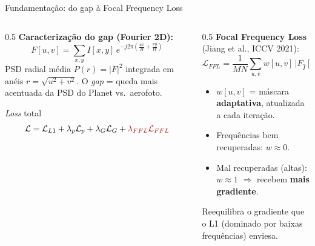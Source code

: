\documentclass[aspectratio=169]{beamer}
\begin{document}
\begin{frame}{Fundamentação: do gap à Focal Frequency Loss}

  \begin{columns}[T]
    \begin{column}{0.5\textwidth}
      \textbf{Caracterização do gap (Fourier 2D):}
      \[
        F[u,v] = \!\!\sum_{x,y}\! I[x,y]\,e^{-j2\pi\left(\frac{ux}{H}+\frac{vy}{W}\right)}
      \]
      PSD radial média $P(r)=|F|^2$ integrada em anéis $r=\sqrt{u^2+v^2}$.
      O \textit{gap} = queda mais acentuada da PSD do Planet vs.\ aerofoto.

      \vspace{0.5em}
      \begin{block}{\textit{Loss} total}
        \[
          \mathcal{L} = \mathcal{L}_{L1} + \lambda_{p}\mathcal{L}_{p}
          + \lambda_{G}\mathcal{L}_{G} + \textcolor{loss}{\lambda_{FFL}\mathcal{L}_{FFL}}
        \]
      \end{block}
    \end{column}
    \begin{column}{0.5\textwidth}
      \textbf{Focal Frequency Loss} (Jiang et al., ICCV 2021):
      \[
        \mathcal{L}_{FFL} = \frac{1}{MN}\sum_{u,v} w[u,v]\,
        \big|F_{\hat{I}}[u,v]-F_{HR}[u,v]\big|^2
      \]
      \begin{itemize}
        \item $w[u,v]$ = máscara \textbf{adaptativa}, atualizada a cada iteração.
        \item Frequências bem recuperadas: $w\!\approx\!0$.
        \item Mal recuperadas (altas): $w\!\approx\!1$ $\Rightarrow$ recebem
              \textbf{mais gradiente}.
      \end{itemize}
      \vspace{0.3em}
      \textcolor{gain}{Reequilibra o gradiente que o L1 (dominado por baixas
      frequências) enviesa.}
    \end{column}
  \end{columns}

\end{frame}
\end{document}
